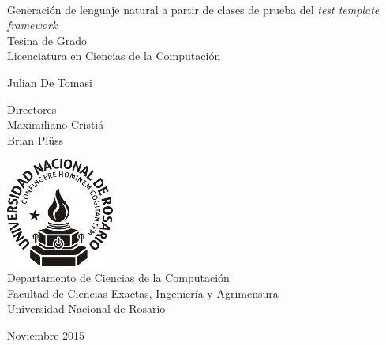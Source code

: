 \documentclass[spanish,11pt,a4paper]{memoir} %
\begin{document}
 

%
%
\thispagestyle{empty}

{%
\sffamily
\centering
\Large

~\vspace{\fill}

{\huge 
Generación de lenguaje natural a partir de clases de prueba del \textit{test template framework}
}\\[0.6em]
Tesina de Grado\\
Licenciatura en Ciencias de la Computación

\vspace{1.5cm}

{\LARGE
Julian De Tomasi
}

\vspace{1.5cm}

{\tiny Directores}\\
Maximiliano Cristiá\\
Brian Plüss\\

\vspace{2.5cm}

\includegraphics[scale=0.8]{img/unr.png}\\
Departamento de Ciencias de la Computación\\
Facultad de Ciencias Exactas, Ingeniería y Agrimensura\\
Universidad Nacional de Rosario

\vspace{\fill}

Noviembre 2015

}%

\cleardoublepage


\tableofcontents

\cleardoublepage
\listoffigures

\cleardoublepage
\listofalgorithms
{}













\appendix





\end{document}
